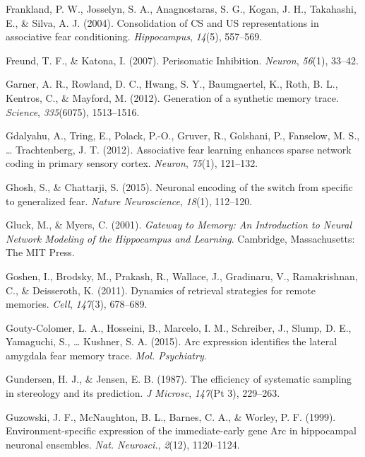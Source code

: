 \documentclass[12pt,a4paperpaper,]{report}
\begin{document}
\hypertarget{ref-franklandux5fconsolidationux5f2004-1}{}
Frankland, P. W., Josselyn, S. A., Anagnostaras, S. G., Kogan, J. H.,
Takahashi, E., \& Silva, A. J. (2004). Consolidation of CS and US
representations in associative fear conditioning. \emph{Hippocampus},
\emph{14}(5), 557--569.

\hypertarget{ref-freundux5fperisomaticux5f2007}{}
Freund, T. F., \& Katona, I. (2007). Perisomatic Inhibition.
\emph{Neuron}, \emph{56}(1), 33--42.

\hypertarget{ref-garnerux5fgenerationux5f2012-2}{}
Garner, A. R., Rowland, D. C., Hwang, S. Y., Baumgaertel, K., Roth, B.
L., Kentros, C., \& Mayford, M. (2012). Generation of a synthetic memory
trace. \emph{Science}, \emph{335}(6075), 1513--1516.

\hypertarget{ref-gdalyahuux5fassociativeux5f2012}{}
Gdalyahu, A., Tring, E., Polack, P.-O., Gruver, R., Golshani, P.,
Fanselow, M. S., \ldots{} Trachtenberg, J. T. (2012). Associative fear
learning enhances sparse network coding in primary sensory cortex.
\emph{Neuron}, \emph{75}(1), 121--132.

\hypertarget{ref-ghoshux5fneuronalux5f2015}{}
Ghosh, S., \& Chattarji, S. (2015). Neuronal encoding of the switch from
specific to generalized fear. \emph{Nature Neuroscience}, \emph{18}(1),
112--120.

\hypertarget{ref-gluckux5fgatewayux5f2001}{}
Gluck, M., \& Myers, C. (2001). \emph{Gateway to Memory: An Introduction
to Neural Network Modeling of the Hippocampus and Learning}. Cambridge,
Massachusetts: The MIT Press.

\hypertarget{ref-goshenux5fdynamicsux5f2011}{}
Goshen, I., Brodsky, M., Prakash, R., Wallace, J., Gradinaru, V.,
Ramakrishnan, C., \& Deisseroth, K. (2011). Dynamics of retrieval
strategies for remote memories. \emph{Cell}, \emph{147}(3), 678--689.

\hypertarget{ref-gouty-colomerux5farcux5f2015}{}
Gouty-Colomer, L. A., Hosseini, B., Marcelo, I. M., Schreiber, J.,
Slump, D. E., Yamaguchi, S., \ldots{} Kushner, S. A. (2015). Arc
expression identifies the lateral amygdala fear memory trace. \emph{Mol.
Psychiatry}.

\hypertarget{ref-gundersenux5fefficiencyux5f1987}{}
Gundersen, H. J., \& Jensen, E. B. (1987). The efficiency of systematic
sampling in stereology and its prediction. \emph{J Microsc},
\emph{147}(Pt 3), 229--263.

\hypertarget{ref-guzowskiux5fenvironment-specificux5f1999-1}{}
Guzowski, J. F., McNaughton, B. L., Barnes, C. A., \& Worley, P. F.
(1999). Environment-specific expression of the immediate-early gene Arc
in hippocampal neuronal ensembles. \emph{Nat. Neurosci.}, \emph{2}(12),
1120--1124.
\end{document}
